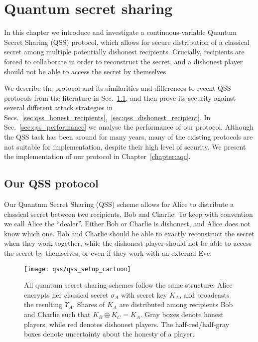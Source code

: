 \chapter{Quantum secret sharing}\label{chapter:qss}


In this chapter we introduce and investigate a continuous-variable Quantum Secret Sharing (QSS) protocol, which allows for secure distribution of a classical secret among multiple potentially dishonest recipients. Crucially, recipients are forced to collaborate in order to reconstruct the secret, and a dishonest player should not be able to access the secret by themselves.

We describe the protocol and its similarities and differences to recent QSS protocols from the literature in Sec.~\ref{sec:qss_our_protocol}, and then prove its security against several different attack strategies in Secs.~\ref{sec:qss_honest_recipients},~\ref{sec:qss_dishonest_recipient}. In Sec.~\ref{sec:qss_performance} we analyse the performance of our protocol. Although the QSS task has been around for many years, many of the existing protocols are not suitable for implementation, despite their high level of security. We present the implementation of our protocol in Chapter~\ref{chapter:aqc}.

\section{Our QSS protocol}\label{sec:qss_our_protocol}

Our Quantum Secret Sharing (QSS) scheme allows for Alice to distribute a classical secret between two recipients, Bob and Charlie. To keep with convention we call Alice the ``dealer''. Either Bob or Charlie is dishonest, and Alice does not know which one. Bob and Charlie should be able to exactly reconstruct the secret when they work together, while the dishonest player should not be able to access the secret by themselves, or even if they work with an external Eve.


\begin{figure}[htp]
\captionsetup{width=\linewidth}
\centering
\texttt{[image: qss/qss\_setup\_cartoon]}
\caption{\label{fig:qss_structure} All quantum secret sharing schemes follow the same structure: Alice encrypts her classical secret $\sigma_A$ with secret key $K_A$, and broadcasts the resulting $\Upsilon_A$. Shares of $K_A$ are distributed among recipients Bob and Charlie such that $K_B \oplus K_C = K_A$. Gray boxes denote honest players, while red denotes dishonest players. The half-red/half-gray boxes denote uncertainty about the honesty of a player. %
}
\end{figure}

